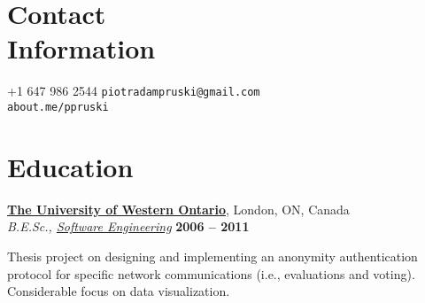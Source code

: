 \documentclass[margin,line]{resume}
\begin{document}
\begin{resume}

\section{\mysidestyle Contact\\Information}

	+1 647 986 2544	\hfill \texttt{piotradampruski@gmail.com}	\vspace{0mm}\\\vspace{0mm}
			\hfill \texttt{about.me/ppruski}		\vspace{0mm}\\\vspace{-4.5mm}



\section{\mysidestyle Education}

	\textbf{\href{http://www.uwo.ca/}{The University of Western Ontario}}, London, ON, Canada	\vspace{2mm}\\\vspace{1mm}
	\textsl{B.E.Sc., \href{http://www.eng.uwo.ca/undergraduate/programs/Software.html}{Software Engineering}}	\hfill \textbf{ 2006 -- 2011}\vspace{-3mm}\\\vspace{-1mm}
	\begin{list2}
		\item Thesis project on designing and implementing an anonymity authentication protocol for specific network communications (i.e., evaluations and voting). Considerable focus on data visualization.
	\end{list2}\vspace{-1.5mm}


\end{resume}
\end{document}

